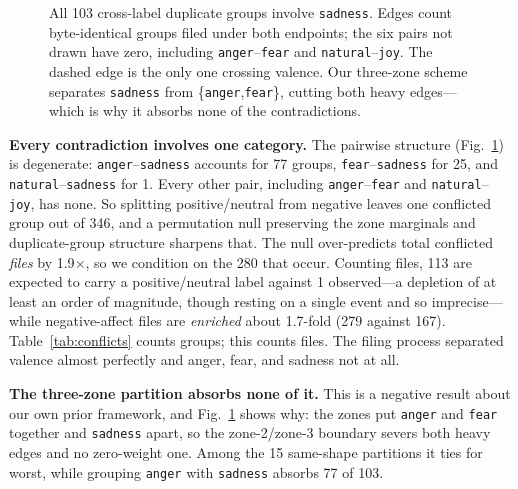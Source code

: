 \documentclass[conference,10pt]{IEEEtran}
\begin{document}
\begin{figure}[t]
\centering
{}
\caption{All 103 cross-label duplicate groups involve \texttt{sadness}. Edges
count byte-identical groups filed under both endpoints; the six pairs not drawn
have zero, including \texttt{anger}--\texttt{fear} and
\texttt{natural}--\texttt{joy}. The dashed edge is the only one crossing
valence. Our three-zone scheme separates \texttt{sadness} from
\{\texttt{anger},\texttt{fear}\}, cutting both heavy edges---which is why it
absorbs none of the contradictions.}
\label{fig:conflicts}
\end{figure}

\textbf{Every contradiction involves one category.} The pairwise structure
(Fig.~\ref{fig:conflicts}) is degenerate: \texttt{anger}--\texttt{sadness}
accounts for 77 groups, \texttt{fear}--\texttt{sadness} for 25, and
\texttt{natural}--\texttt{sadness} for 1. Every other pair, including
\texttt{anger}--\texttt{fear} and \texttt{natural}--\texttt{joy}, has none. So
splitting positive/neutral from negative leaves one conflicted group out of 346,
and a permutation null preserving the zone marginals and duplicate-group
structure sharpens that.
The null over-predicts total conflicted
\emph{files} by 1.9$\times$, so we condition on the 280 that occur. Counting
files, 113 are expected to carry a positive/neutral label against 1 observed---a
depletion of at least an order of magnitude, though resting on a single event and
so imprecise---while negative-affect files are \emph{enriched} about 1.7-fold
(279 against 167). Table~\ref{tab:conflicts} counts groups; this counts files. The filing process
separated valence almost perfectly and anger, fear, and sadness not at all.

\textbf{The three-zone partition absorbs none of it.} This is a negative result
about our own prior framework, and Fig.~\ref{fig:conflicts} shows why: the zones
put \texttt{anger} and \texttt{fear} together and \texttt{sadness} apart, so the
zone-2/zone-3 boundary severs both heavy edges and no zero-weight one. Among the
15 same-shape partitions it ties for worst, while grouping \texttt{anger} with
\texttt{sadness} absorbs 77 of 103.
\end{document}
